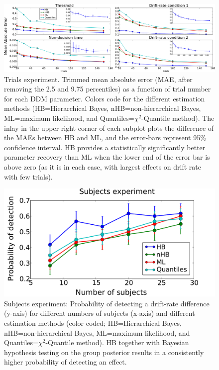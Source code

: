 \documentclass[letterpaper,10pt,english]{article}
\begin{document}
\begin{figure}
\includegraphics[width=\columnwidth]{fig6.pdf}
\caption{Trials experiment. Trimmed mean absolute error (MAE, after removing the 2.5 and 9.75 percentiles) as a function of trial number for each DDM parameter. Colors code for the different estimation methods (HB=Hierarchical Bayes, nHB=non-hierarchical Bayes, ML=maximum likelihood, and Quantiles=$\chi^2$-Quantile method). The inlay in the upper right corner of each subplot plots the difference of the MAEs between HB and ML, and the error-bars represent 95\% confidence interval.  HB provides a statistically significantly better parameter recovery than ML when the lower end of the error bar is above zero (as it is in each case, with largest effects on drift rate with few trials).}
\label{fig.trials}
\end{figure}

\begin{figure}
\includegraphics[width=.6\columnwidth]{fig7.pdf}
\caption{Subjects experiment: Probability of detecting a drift-rate
difference (y-axis) for different numbers of subjects (x-axis) and
different estimation methods (color coded; HB=Hierarchical Bayes,
nHB=non-hierarchical Bayes, ML=maximum likelihood, and
Quantiles=$\chi^2$-Quantile method). HB together with Bayesian
hypothesis testing on the group posterior results in a consistently
higher probability of detecting an effect.}
\label{fig.subjs}
\end{figure}
\end{document}
